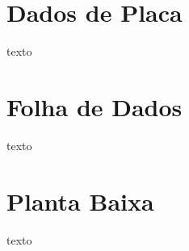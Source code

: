 \begin{anexosenv}
\partanexos
\chapter{Dados de Placa}
texto

\chapter{Folha de Dados}
texto

\chapter{Planta Baixa}
texto

\end{anexosenv}